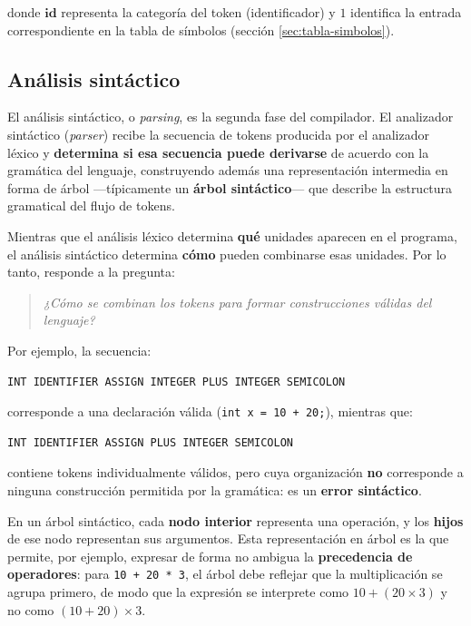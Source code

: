 \documentclass[11pt,a4paper]{article}
\begin{document}
donde $\mathbf{id}$ representa la categoría del token (identificador) y $1$ identifica la
entrada correspondiente en la tabla de símbolos (sección \ref{sec:tabla-simbolos}).

\subsection{Análisis sintáctico}
\label{sec:sintactico}

El análisis sintáctico, o \textit{parsing}, es la segunda fase del compilador. El analizador
sintáctico (\textit{parser}) recibe la secuencia de tokens producida por el analizador léxico y
\textbf{determina si esa secuencia puede derivarse} de acuerdo con la gramática del lenguaje,
construyendo además una representación intermedia en forma de árbol —típicamente un
\textbf{árbol sintáctico}— que describe la estructura gramatical del flujo de tokens.

Mientras que el análisis léxico determina \textbf{qué} unidades aparecen en el programa, el
análisis sintáctico determina \textbf{cómo} pueden combinarse esas unidades. Por lo tanto,
responde a la pregunta:

\begin{quote}
\textit{¿Cómo se combinan los tokens para formar construcciones válidas del lenguaje?}
\end{quote}

Por ejemplo, la secuencia:

\begin{lstlisting}
INT IDENTIFIER ASSIGN INTEGER PLUS INTEGER SEMICOLON
\end{lstlisting}

corresponde a una declaración válida (\texttt{int x = 10 + 20;}), mientras que:

\begin{lstlisting}
INT IDENTIFIER ASSIGN PLUS INTEGER SEMICOLON
\end{lstlisting}

contiene tokens individualmente válidos, pero cuya organización \textbf{no} corresponde a
ninguna construcción permitida por la gramática: es un \textbf{error sintáctico}.

En un árbol sintáctico, cada \textbf{nodo interior} representa una operación, y los
\textbf{hijos} de ese nodo representan sus argumentos. Esta representación en árbol es la que
permite, por ejemplo, expresar de forma no ambigua la \textbf{precedencia de operadores}: para
\texttt{10 + 20 * 3}, el árbol debe reflejar que la multiplicación se agrupa primero, de modo
que la expresión se interprete como $10 + (20 \times 3)$ y no como $(10+20)\times 3$.
\end{document}
